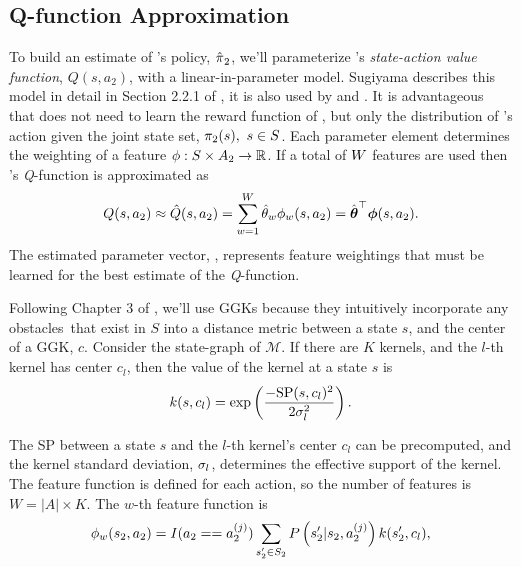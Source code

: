 \subsection{Q-function Approximation}\label{sec:policy_parameterization}
    To build an estimate of 's policy, $\hat{\pi_{}}_2$,  we'll parameterize 's
    \textit{state-action value function}, $Q(s,a_2)$, with a linear-in-parameter model. Sugiyama describes this model in
    detail in Section 2.2.1 of \cite{Sugiyama2015StatisticalRL}, it is also used by \cite{Hanawal2017LearningPolicies}
    and \cite{akiyama2010efficient}. It is advantageous that  does not need to learn the reward function of
    , but only the distribution of 's action given the joint state set, $\pi_{2}(s),\ s\in S$. Each
    parameter element determines the weighting of a feature $\phi : S \times A_2 \rightarrow \mathbb{R}$. If a total of
    $W$ features are used then 's \textit{Q}-function is approximated as
    \begin{equation*}\label{eq:QFuncApprox}
    Q(s,a_2) \approx \hat{Q}(s,a_2)
    = \sum_{w=1}^{W} \hat{\theta}_{w} \phi_{w}(s,a_2)
    = \hat{\boldsymbol{\mathbb{\theta}}}^\top \boldsymbol{\mathbb{\phi}}(s, a_2).
    \end{equation*}
    The estimated parameter vector, \estimate{\paramVec}, represents feature weightings that must be learned for the
    best estimate of the \emph{Q}-function.

    Following Chapter 3 of \cite{Sugiyama2015StatisticalRL}, we'll use \acp{GGK} because they intuitively incorporate
    any obstacles\footnotemark\ that exist in $S$ into a distance metric between a state $s$, and the center of a
    \ac{GGK}, $c$. Consider the state-graph of $\mathcal{M}$. If there are $K$ kernels, and the $l$-th kernel has center
    $c_l$, then the value of the kernel at a state $s$ is
    \begin{equation*}
        k(s,c_{l}) = \exp \left( \frac{-\text{SP}(s,c_{l})^2}
                                                             {2\sigma^2_{l}} \right).
    \end{equation*}


    \noindent
    The \ac{SP} between a state $s$ and the $l$-th kernel's center $c_l$ can be precomputed, and the kernel standard
    deviation, $\sigma_{l}$, determines the effective support of the kernel. The feature function is defined
    for each action, so the number of features is $W = |A| \times K$. The $w$-th feature function is
    \begin{equation}\label{eq:kernel_func}
        \phi_{w}(s_2,a_2) = I(a_2==a_2^{(j)})\sum_{s_2'\in S_2}P\left(s_2'|s_2,a_2^{(j)}\right)
                                k(s_2',c_{l}),
    \end{equation}

